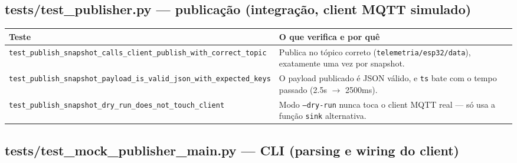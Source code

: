 \documentclass[10pt,a4paper]{article}
\begin{document}
\subsection{tests/test\_\allowbreak publisher.py --- publicação (integração, client MQTT simulado)}

\begin{center}
\begin{longtable}{L{5cm}L{9.5cm}}
\toprule
\textbf{Teste} & \textbf{O que verifica e por quê} \\
\midrule
\endhead
\texttt{test\_\allowbreak publish\_\allowbreak snapshot\_\allowbreak calls\_\allowbreak client\_\allowbreak publish\_\allowbreak with\_\allowbreak correct\_\allowbreak topic} & Publica no tópico correto (\texttt{telemetria/esp32/data}), exatamente uma vez por snapshot. \\
\texttt{test\_\allowbreak publish\_\allowbreak snapshot\_\allowbreak payload\_\allowbreak is\_\allowbreak valid\_\allowbreak json\_\allowbreak with\_\allowbreak expected\_\allowbreak keys} & O payload publicado é JSON válido, e \texttt{ts} bate com o tempo passado (2.5s $\to$ 2500ms). \\
\texttt{test\_\allowbreak publish\_\allowbreak snapshot\_\allowbreak dry\_\allowbreak run\_\allowbreak does\_\allowbreak not\_\allowbreak touch\_\allowbreak client} & Modo \texttt{--dry-run} nunca toca o client MQTT real — só usa a função \texttt{sink} alternativa. \\
\bottomrule
\end{longtable}
\end{center}

\subsection{tests/test\_\allowbreak mock\_\allowbreak publisher\_\allowbreak main.py --- CLI (parsing e wiring do client)}
\end{document}
